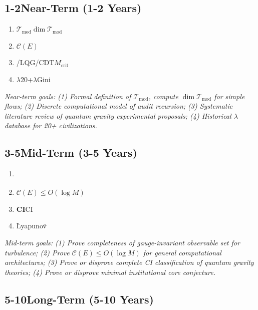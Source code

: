 \documentclass[12pt,a4paper]{article}
\theoremstyle{remark}
\newcommand{\T}{\mathcal{T}}
\begin{document}
\subsection{1-2Near-Term (1-2 Years)}

\begin{enumerate}[label=\textbf{Q\arabic*:}, leftmargin=*]
    \item \textbf{}$\T_{\text{mod}}$$\dim \T_{\text{mod}}$
    
    \item \textbf{}$\mathcal{C}(E)$
    
    \item \textbf{}/LQG/CDT$M_{\text{crit}}$
    
    \item \textbf{$\lambda$}20+$\lambda$Gini
\end{enumerate}

\medskip
\noindent\textit{Near-term goals: (1) Formal definition of $\T_{\text{mod}}$, compute $\dim \T_{\text{mod}}$ for simple flows; (2) Discrete computational model of audit recursion; (3) Systematic literature review of quantum gravity experimental proposals; (4) Historical $\lambda$ database for 20+ civilizations.}

\subsection{3-5Mid-Term (3-5 Years)}

\begin{enumerate}[label=\textbf{Q\arabic*:}, leftmargin=*]
    \item \textbf{}
    
    \item \textbf{}$\mathcal{C}(E) \leq O(\log M)$
    
    \item \textbf{CI}CI
    
    \item \textbf{}\"Lyapunov\"
\end{enumerate}

\medskip
\noindent\textit{Mid-term goals: (1) Prove completeness of gauge-invariant observable set for turbulence; (2) Prove $\mathcal{C}(E) \leq O(\log M)$ for general computational architectures; (3) Prove or disprove complete CI classification of quantum gravity theories; (4) Prove or disprove minimal institutional core conjecture.}

\subsection{5-10Long-Term (5-10 Years)}
\end{document}
